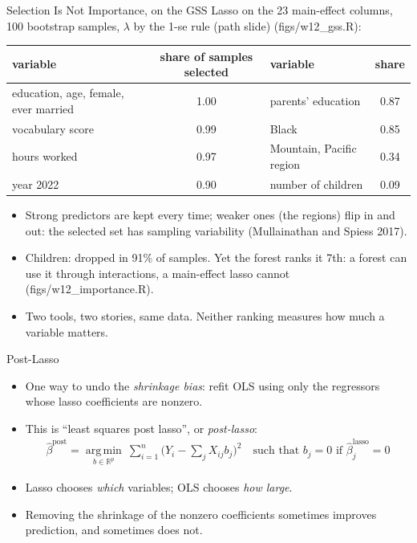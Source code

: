 \documentclass[aspectratio=169,11pt,xcolor=dvipsnames]{beamer}
\newcommand{\srcp}[1]{{\scriptsize\color{gray}(#1)}}
\DeclareMathOperator*{\argminop}{arg\,min}
\newcommand{\argmin}{\argminop\limits}
\newcommand{\R}{\mathbb{R}}
\newcommand{\core}{\,\raisebox{0.6pt}{\textcolor{corestar}{$\bigstar$}}}
\begin{document}
\begin{frame}{Selection Is Not Importance, on the GSS}
Lasso on the 23 main-effect columns, 100 bootstrap samples, $\lambda$ by the 1-se rule (path slide)
\srcp{figs/w12\_gss.R}:
\begin{center}\footnotesize
\renewcommand{\arraystretch}{1.0}
\begin{tabular}{@{}lc|lc@{}}
\toprule
variable & share of samples selected & variable & share \\
\midrule
education, age, female, ever married & 1.00 & parents' education & 0.87 \\
vocabulary score & 0.99 & Black & 0.85 \\
hours worked & 0.97 & Mountain, Pacific region & 0.34 \\
year 2022 & 0.90 & \alert{number of children} & \alert{0.09} \\
\bottomrule
\end{tabular}
\end{center}
\vskip3pt
\begin{itemize}\itemsep2pt
  \item Strong predictors are kept every time; weaker ones (the regions) flip in and out:
        the selected set has sampling variability \srcp{Mullainathan and Spiess 2017}.
  \item Children: dropped in 91\% of samples. Yet the forest ranks it 7th: a forest can use it
        through interactions, a main-effect lasso cannot \srcp{figs/w12\_importance.R}.
  \item Two tools, two stories, same data. Neither ranking measures how much a variable matters.
\end{itemize}
\end{frame}

\begin{frame}{Post-Lasso\core}
\begin{itemize}\itemsep4pt
  \item One way to undo the \textit{shrinkage bias}: refit OLS using only the
        regressors whose lasso coefficients are nonzero.
  \item This is ``least squares post lasso'', or \textit{post-lasso}:
  \begin{align*}
    \hat\beta^{\text{post}} = \argmin_{b\in\R^p}\ \sum_{i=1}^n\big(Y_i - \textstyle\sum_{j} X_{ij} b_j\big)^2
    \quad\text{such that } b_j = 0 \text{ if } \hat\beta_j^{\text{lasso}} = 0
  \end{align*}
  \item Lasso chooses \emph{which} variables; OLS chooses \emph{how large}.
  \item Removing the shrinkage of the nonzero coefficients sometimes improves
        prediction, and sometimes does not.
\end{itemize}
\end{frame}
\end{document}
